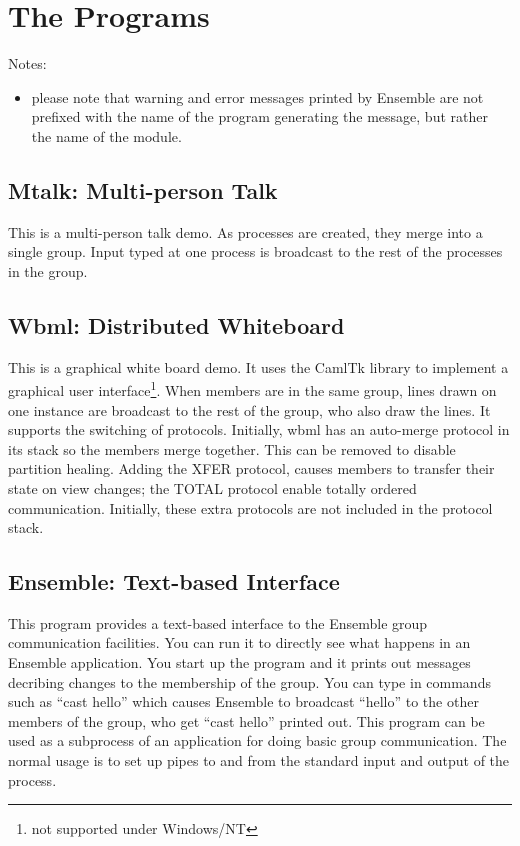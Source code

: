 %
%
%
\section{The Programs}

Notes:
\begin{itemize}
\item
please note that warning and error messages printed by Ensemble are
not prefixed with the name of the program generating the message, but
rather the name of the module.
\end{itemize}

\subsection{Mtalk: Multi-person Talk}
This is a multi-person talk demo.  As  processes are created, they merge
into a single group.  Input typed at one process is broadcast to the rest of the
processes in the group.

\subsection{Wbml: Distributed Whiteboard}
This is a graphical white board demo.  It uses the CamlTk library to implement a
graphical user interface\footnote{not supported under Windows/NT}.  When members are
in the same group, lines drawn on one instance are broadcast to the rest of the
group, who also draw the lines.  It supports the switching of protocols.  Initially,
wbml has an auto-merge protocol in its stack so the members merge together.  This can
be removed to disable partition healing.  Adding the XFER protocol, causes members to
transfer their state on view changes; the TOTAL protocol enable totally ordered
communication.  Initially, these extra protocols are not included in the protocol
stack.

\subsection{Ensemble: Text-based Interface}
\label{section:ensemble-demo}
This program provides a text-based interface to the Ensemble group
communication facilities.  You can run it to directly see what happens in an
Ensemble application.  You start up the program and it prints out messages
decribing changes to the membership of the group.  You can type in commands
such as ``cast hello'' which causes Ensemble to broadcast ``hello'' to the
other members of the group, who get ``cast hello'' printed out.  This program
can be used as a subprocess of an application for doing basic group
communication.  The normal usage is to set up pipes to and from the standard
input and output of the  process.

